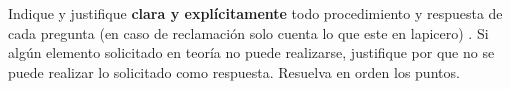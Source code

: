 \documentclass[12pt]{article}
\begin{document}
Indique y justifique \textbf{clara y explícitamente} todo procedimiento y respuesta de cada pregunta %
(en caso de reclamación solo cuenta lo que este en lapicero) %
. Si algún elemento solicitado en teoría no puede realizarse, justifique por que no se puede realizar lo solicitado como respuesta. %
Resuelva en orden los puntos. %




\end{document}
